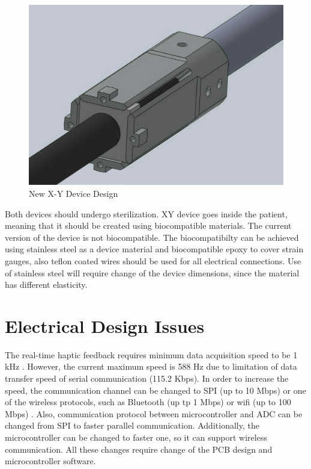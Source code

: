 \begin{figure}[h]
	\begin{center}
		\includegraphics[width=120mm]{fig/methods/new_xy_dev.png}
	\end{center}
	\vspace{-4mm}
	\caption[New X-Y Device Design]
	{New X-Y Device Design}
	\label{fig:NewXYDesign}
	\vspace{-2mm}
\end{figure}
	
	Both devices should undergo sterilization. XY device goes inside the patient, meaning that it should be created using biocompatible materials. The current version of the device is not biocompatible. The biocompatibilty can be achieved using stainless steel as a device material and biocompatible epoxy to cover strain gauges, also teflon coated wires should be used for all electrical connections. Use of stainless steel will require change of the device dimensions, since the material has different elasticity.
	
\section{Electrical Design Issues}
	The real-time haptic feedback requires minimum data acquisition speed to be 1 kHz \cite{seungmoon_choi_effect_2004}. However, the current maximum speed is 588 Hz due to limitation of data transfer speed of serial communication (115.2 Kbps). In order to increase the speed, the communication channel can be changed to SPI (up to 10 Mbps) \cite{_uart_porotocol} or one of the wireless protocols, such as Bluetooth (up tp 1 Mbps) or wifi (up to 100 Mbps) \cite{_wireless_protocols}. Also, communication protocol between microcontroller and ADC can be changed from SPI to faster parallel communication. Additionally, the microcontroller can be changed to faster one, so it can support wireless communication. All these changes require change of the PCB design and microcontroller software. 
	

